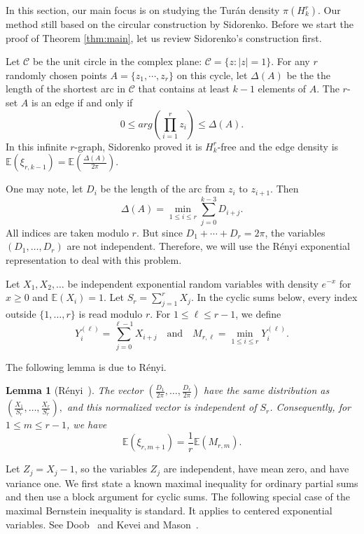 \documentclass[10pt,a4paper]{amsart}
\numberwithin{equation}{section}
\newtheorem{lemma}[theorem]{Lemma}
\begin{document}
In this section,  our main focus is on studying the Tur\'an density $\pi(H_k^r)$. Our method still based on the circular construction by Sidorenko.  Before we start the proof of Theorem \ref{thm:main}, let us review Sidorenko's construction first.
 
Let $\mathcal C$ be the unit circle in the complex plane: $\mathcal C=\{z: |z|=1\}$. For any $r$  randomly chosen points $A=\{z_1,\cdots,z_r\}$ on this cycle, let  $\Delta(A)$ be the the length of the shortest arc in $\mathcal C$ that contains at least $k-1$ elements of $A$.
The $r$-set $A$ is an edge if and only if 
\[0\le arg(\prod_{i=1}^{r}z_i)\le \Delta(A).\]
In this infinite $r$-graph, Sidorenko proved it is $H_k^r$-free and the edge density is $\mathbb{E}(\xi_{r,k-1})=\mathbb{E}(\frac{\Delta(A)}{2\pi})$.


One may note, let $D_i$ be the length of the arc from $z_i$ to $z_{i+1}$. Then
\[\Delta(A)=\min_{1\le i\le r} \sum_{j=0}^{k-3}D_{i+j}.\]
All indices are taken modulo $r$. But since $D_1+\cdots +D_r=2\pi$, the variables $(D_1,\ldots, D_r)$ are not independent. Therefore, we will use the R\'enyi exponential representation to deal with this problem.

Let $X_1,X_2,\ldots$ be independent exponential random variables with density $e^{-x}$ for $x\ge0$ and $\mathbb{E}(X_i)=1$.  
Let $S_r=\sum_{j=1}^rX_j$.  In the cyclic sums below, every index outside $\{1,\ldots,r\}$ is read modulo $r$.
For $1\le\ell\le r-1$, we define
$$Y_i^{(\ell)}=\sum_{j=0}^{\ell-1}X_{i+j}
\quad \text{and} \quad
M_{r,\ell}=\min_{1\le i\le r}Y_i^{(\ell)}.$$

The following lemma is due to R\'enyi.
\begin{lemma}[R\'enyi~\cite{Renyi1953}]\label{lem:renyi1953}
The vector $(\frac{D_1}{2\pi },\ldots, \frac{D_r}{2\pi })$ have the same distribution as
$\left(\frac{X_1}{S_r},\ldots,\frac{X_r}{S_r}\right),$
and this normalized vector is independent of $S_r$.  Consequently, for $1\le m\le r-1$, we have
\begin{equation}\label{eq:spacing-expectation}
        \mathbb{E}(\xi_{r,m+1})=\frac1r\mathbb{E}(M_{r,m}).
\end{equation}
\end{lemma}


\medskip

Let $Z_j=X_j-1$, so the variables $Z_j$ are independent, have mean zero, and have variance one.  We first state a known maximal inequality for ordinary partial sums and then use a block argument for cyclic sums. The following special case of the maximal Bernstein inequality is standard. 
It applies to centered exponential variables. 
See Doob~\cite{Doob1953} and Kevei and Mason~\cite{KeveiMason2011}.
\end{document}
